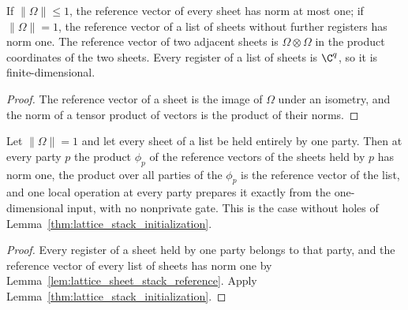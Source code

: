 \begin{lemma}
    \label{lem:lattice_sheet_stack_reference}
    \leanok
    If $\lVert\Omega\rVert\le1$, the reference vector of every sheet has norm at
    most one; if $\lVert\Omega\rVert=1$, the reference vector of a list of sheets
    without further registers has norm one. The reference vector of two adjacent
    sheets is $\Omega\otimes\Omega$ in the product coordinates of the two sheets.
    Every register of a list of sheets is $\C^q$, so it is finite-dimensional.
\end{lemma}

\begin{proof}\leanok
    The reference vector of a sheet is the image of $\Omega$ under an isometry,
    and the norm of a tensor product of vectors is the product of their norms.
\end{proof}

\begin{lemma}
    \label{thm:lattice_sheet_initialization}
    \leanok
    Let $\lVert\Omega\rVert=1$ and let every sheet of a list be held entirely by
    one party. Then at every party $p$ the product $\phi_p$ of the reference
    vectors of the sheets held by $p$ has norm one, the product over all parties
    of the $\phi_p$ is the reference vector of the list, and one local operation
    at every party prepares it exactly from the one-dimensional input, with no
    nonprivate gate. This is the case without holes of
    Lemma~\ref{thm:lattice_stack_initialization}.
\end{lemma}

\begin{proof}\leanok
    Every register of a sheet held by one party belongs to that party, and the
    reference vector of every list of sheets has norm one by
    Lemma~\ref{lem:lattice_sheet_stack_reference}. Apply
    Lemma~\ref{thm:lattice_stack_initialization}.
\end{proof}
